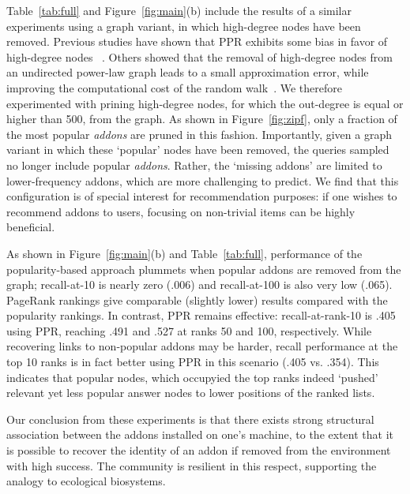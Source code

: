 \documentclass[ijoc,nonblindrev]{informs3} %
\numberwithin{equation}{subsection}
\begin{document}
Table~\ref{tab:full} and Figure~\ref{fig:main}(b) include the results of a similar experiments using a graph variant, in which high-degree nodes have been removed. Previous studies have shown that PPR exhibits some bias in favor of high-degree nodes ~\citep{tong2006center,budalakoti2012}. Others showed that the removal of high-degree nodes from an undirected power-law graph leads to a small approximation error, while improving the computational cost of the random walk~\cite{sarkar2010tractable}. We therefore experimented with prining high-degree nodes, for which the out-degree is equal or higher than 500, from the graph. As shown in Figure~\ref{fig:zipf}, only a fraction of the most popular {\it addons} are pruned in this fashion. Importantly, given a graph variant in which these `popular' nodes have been removed, the queries sampled no longer include popular {\it addons}. Rather, the `missing addons' are limited to lower-frequency addons, which are more challenging to predict. We find that this configuration is of special interest for recommendation purposes: if one wishes to recommend addons to users, focusing on non-trivial items can be highly beneficial.

As shown in Figure~\ref{fig:main}(b) and Table~\ref{tab:full}, performance of the popularity-based approach plummets when popular addons are removed from the graph; recall-at-10 is nearly zero (.006) and recall-at-100 is also very low (.065). PageRank rankings give comparable (slightly lower) results compared with the popularity rankings. In contrast, PPR remains effective: recall-at-rank-10 is .405 using PPR, reaching .491 and .527 at ranks 50 and 100, respectively. While recovering links to non-popular addons may be harder, recall performance at the top 10 ranks is in fact better using PPR in this scenario (.405 vs. .354). This indicates that popular nodes, which occupyied the top ranks indeed `pushed' relevant yet less popular answer nodes to lower positions of the ranked lists.  

Our conclusion from these experiments is that there exists strong structural association between the addons installed on one's machine, to the extent that it is possible to recover the identity of an addon if removed from the environment with high success. The community is resilient in this respect, supporting the analogy to ecological biosystems. 
\end{document}
